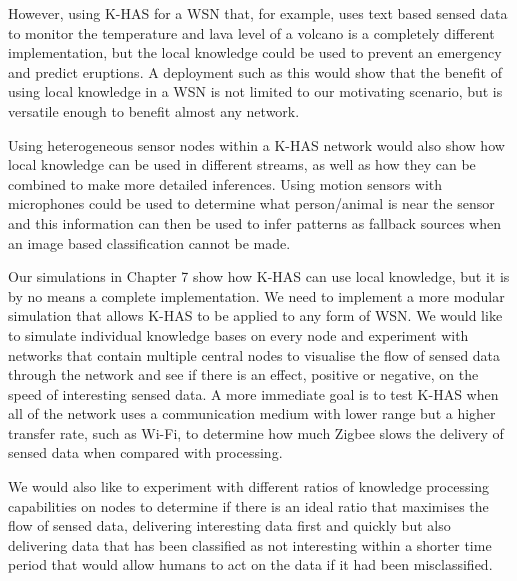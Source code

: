 However, using K-HAS for a WSN that, for example, uses text based sensed data to monitor the temperature and lava level of a volcano is a completely different implementation, but the local knowledge could be used to prevent an emergency and predict eruptions. A deployment such as this would show that the benefit of using local knowledge in a WSN is not limited to our motivating scenario, but is versatile enough to benefit almost any network.

Using heterogeneous sensor nodes within a K-HAS network would also show how local knowledge can be used in different streams, as well as how they can be combined to make more detailed inferences.  Using motion sensors with microphones could be used to determine what person/animal is near the sensor and this information can then be used to infer patterns as fallback sources when an image based classification cannot be made.

Our simulations in Chapter 7 show how K-HAS can use local knowledge, but it is by no means a complete implementation.  We need to implement a more modular simulation that allows K-HAS to be applied to any form of WSN. We would like to simulate individual knowledge bases on every node and experiment with networks that contain multiple central nodes to visualise the flow of sensed data through the network and see if there is an effect, positive or negative, on the speed of interesting sensed data. A more immediate goal is to test K-HAS when all of the network uses a communication medium with lower range but a higher transfer rate, such as Wi-Fi, to determine how much Zigbee slows the delivery of sensed data when compared with processing.

We would also like to experiment with different ratios of knowledge processing capabilities on nodes to determine if there is an ideal ratio that maximises the flow of sensed data, delivering interesting data first and quickly but also delivering data that has been classified as not interesting within a shorter time period that would allow humans to act on the data if it had been misclassified.
